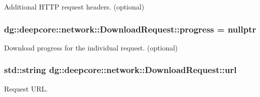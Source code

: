 Additional H\+T\+TP request headers. (optional) 

\subsubsection[{\texorpdfstring{progress}{progress}}]{ dg\+::deepcore\+::network\+::\+Download\+Request\+::progress = nullptr}\hypertarget{structdg_1_1deepcore_1_1network_1_1_download_request_ac2c22b1c491ff60d2ac5e15419b1b04b}{}\label{structdg_1_1deepcore_1_1network_1_1_download_request_ac2c22b1c491ff60d2ac5e15419b1b04b}


Download progress for the individual request. (optional) 

\subsubsection[{\texorpdfstring{url}{url}}]{\setlength{\rightskip}{0pt plus 5cm}std\+::string dg\+::deepcore\+::network\+::\+Download\+Request\+::url}\hypertarget{structdg_1_1deepcore_1_1network_1_1_download_request_a27a77bb34f9c7a50280643a7f5642645}{}\label{structdg_1_1deepcore_1_1network_1_1_download_request_a27a77bb34f9c7a50280643a7f5642645}


Request U\+RL. 

